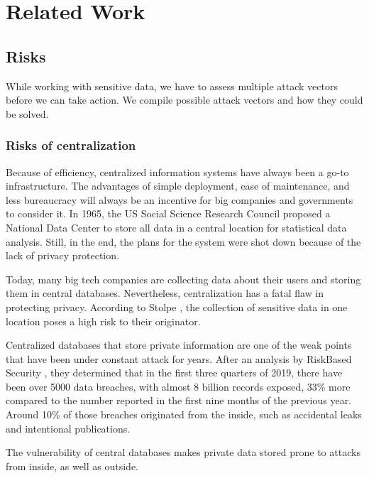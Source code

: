 
\chapter{Related Work}\label{chapter:relatedwork}
\section{Risks}
While working with sensitive data, we have to assess multiple attack vectors before we can take action. We compile possible attack vectors and how they could be solved.

\subsection{Risks of centralization}
Because of efficiency, centralized information systems have always been a go-to infrastructure. The advantages of simple deployment, ease of maintenance, and less bureaucracy will always be an incentive for big companies and governments to consider it. In 1965, the US Social Science Research Council \cite{lawreview} proposed a National Data Center to store all data in a central location for statistical data analysis. Still, in the end, the plans for the system were shot down because of the lack of privacy protection.

Today, many big tech companies are collecting data about their users and storing them in central databases. Nevertheless, centralization has a fatal flaw in protecting privacy. According to Stolpe \cite{DBLP:journals/sigkdd/Stolpe16}, the collection of sensitive data in one location poses a high risk to their originator.

Centralized databases that store private information are one of the weak points that have been under constant attack for years. After an analysis by RiskBased Security \cite{riskbasedsecurity}, they determined that in the first three quarters of 2019, there have been over 5000 data breaches, with almost 8 billion records exposed, 33\% more compared to the number reported in the first nine months of the previous year. Around 10\% of those breaches originated from the inside, such as accidental leaks and intentional publications.

The vulnerability of central databases makes private data stored prone to attacks from inside, as well as outside.

